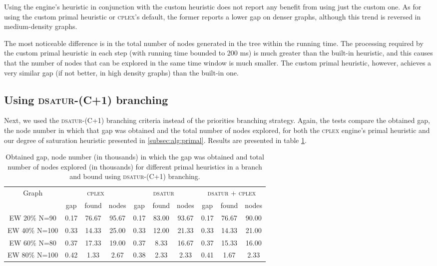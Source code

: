 Using the engine's heuristic in conjunction with the custom heuristic does not report any benefit from using just the custom one. As for using the custom primal heuristic or \textsc{cplex}'s default, the former reports a lower gap on denser graphs, although this trend is reversed in medium-density graphs.

The most noticeable difference is in the total number of nodes generated in the tree within the running time. The processing required by the custom primal heuristic in each step (with running time bounded to 200 ms) is much greater than the built-in heuristic, and this causes that the number of nodes that can be explored in the same time window is much smaller. The custom primal heuristic, however, achieves a very similar gap (if not better, in high density graphs) than the built-in one.

\subsection{Using \textsc{dsatur-(C+1)} branching}

Next, we used the \textsc{dsatur-(C+1)} branching criteria instead of the priorities branching strategy. Again, the tests compare the obtained gap, the node number in which that gap was obtained and the total number of nodes explored, for both the \textsc{cplex} engine's primal heuristic and our degree of saturation heuristic presented in \ref{subsec:alg:primal}. Results are presented in table \ref{table:primal:dsatur}.

\begin{table}[h]
\centering

\begin{tabular}{|c|ccc|ccc|ccc|}
\hline
\multicolumn{1}{|c|}{Graph} & \multicolumn{3}{|c|}{\textsc{cplex}} & \multicolumn{3}{|c|}{\textsc{dsatur}} & \multicolumn{3}{|c|}{\textsc{dsatur} + \textsc{cplex}}
\\
 & gap & found & nodes & gap & found & nodes & gap & found & nodes 
\\
\hline
EW 20\% N=90 & 0.17 & 76.67 & 95.67 & 0.17 & 83.00 & 93.67 & 0.17 & 76.67 & 90.00
\\
EW 40\% N=100 & 0.33 & 14.33 & 25.00 & 0.33 & 12.00 & 21.33 & 0.33 & 14.33 & 21.00
\\
EW 60\% N=80 & 0.37 & 17.33 & 19.00 & 0.37 & 8.33 & 16.67 & 0.37 & 15.33 & 16.00
\\
EW 80\% N=100 & 0.42 & 1.33 & 2.67 & 0.38 & 2.33 & 2.33 & 0.41 & 1.67 & 2.33
\\
\hline 
\end{tabular}

\caption{Obtained gap, node number (in thousands) in which the gap was obtained and total number of nodes explored (in thousands) for different primal heuristics in a branch and bound using \textsc{dsatur-(C+1)} branching.}
\label{table:primal:dsatur}

\end{table}

